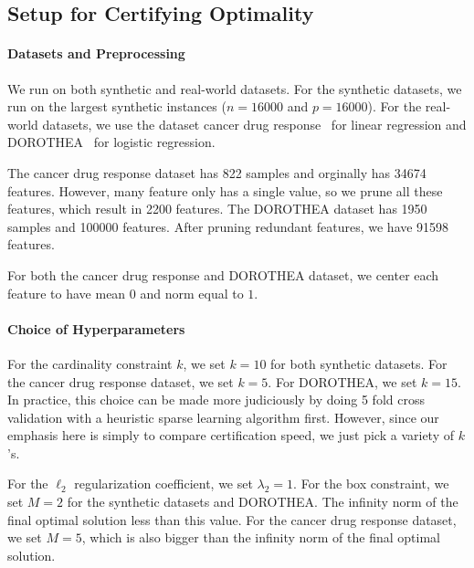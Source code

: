 \subsection{Setup for Certifying Optimality}
\label{appendix:setup_for_certifying_optimality}

\paragraph{Datasets and Preprocessing}
We run on both synthetic and real-world datasets.
For the synthetic datasets, we run on the largest synthetic instances ($n=16000$ and $p=16000$).
For the real-world datasets, we use the dataset cancer drug response~\cite{liu2020deepcdr} for linear regression and DOROTHEA~\cite{asuncion2007uci} for logistic regression.

The cancer drug response dataset has 822 samples and orginally has 34674 features.
However, many feature only has a single value, so we prune all these features, which result in 2200 features.
The DOROTHEA dataset has 1950 samples and 100000 features.
After pruning redundant features, we have 91598 features.

For both the cancer drug response and DOROTHEA dataset, we center each feature to have mean $0$ and norm equal to $1$.

\paragraph{Choice of Hyperparameters}
For the cardinality constraint $k$, we set $k=10$ for both synthetic datasets.
For the cancer drug response dataset, we set $k=5$.
For DOROTHEA, we set $k=15$.
In practice, this choice can be made more judiciously by doing 5 fold cross validation with a heuristic sparse learning algorithm first.
However, since our emphasis here is simply to compare certification speed, we just pick a variety of $k$'s.

For the $\ell_2$ regularization coefficient, we set $\lambda_2=1$.
For the box constraint, we set $M=2$ for the synthetic datasets and DOROTHEA.
The infinity norm of the final optimal solution less than this value.
For the cancer drug response dataset, we set $M=5$, which is also bigger than the infinity norm of the final optimal solution.

